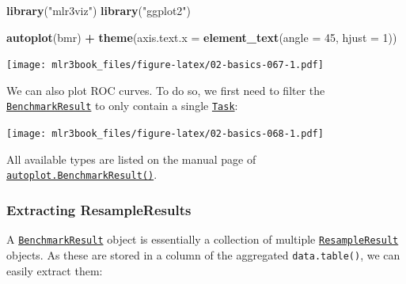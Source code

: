 \documentclass[]{article}
\newenvironment{Shaded}{\begin{snugshade}}{\end{snugshade}}
\newcommand{\DataTypeTok}[1]{\textcolor[rgb]{0.13,0.29,0.53}{#1}}
\newcommand{\DecValTok}[1]{\textcolor[rgb]{0.00,0.00,0.81}{#1}}
\newcommand{\KeywordTok}[1]{\textcolor[rgb]{0.13,0.29,0.53}{\textbf{#1}}}
\newcommand{\NormalTok}[1]{#1}
\newcommand{\OperatorTok}[1]{\textcolor[rgb]{0.81,0.36,0.00}{\textbf{#1}}}
\newcommand{\StringTok}[1]{\textcolor[rgb]{0.31,0.60,0.02}{#1}}
\renewenvironment{Shaded} {\begin{snugshade}\small} {\end{snugshade}}
\begin{document}
\begin{Shaded}
\begin{Highlighting}[]
\KeywordTok{library}\NormalTok{(}\StringTok{"mlr3viz"}\NormalTok{)}
\KeywordTok{library}\NormalTok{(}\StringTok{"ggplot2"}\NormalTok{)}

\KeywordTok{autoplot}\NormalTok{(bmr) }\OperatorTok{+}\StringTok{ }\KeywordTok{theme}\NormalTok{(}\DataTypeTok{axis.text.x =} \KeywordTok{element_text}\NormalTok{(}\DataTypeTok{angle =} \DecValTok{45}\NormalTok{, }\DataTypeTok{hjust =} \DecValTok{1}\NormalTok{))}
\end{Highlighting}
\end{Shaded}

\texttt{[image: mlr3book\_files/figure-latex/02-basics-067-1.pdf]}

We can also plot ROC curves.
To do so, we first need to filter the \href{https://mlr3.mlr-org.com/reference/BenchmarkResult.html}{\texttt{BenchmarkResult}} to only contain a single \href{https://mlr3.mlr-org.com/reference/Task.html}{\texttt{Task}}:

\begin{Shaded}
\end{Shaded}

\texttt{[image: mlr3book\_files/figure-latex/02-basics-068-1.pdf]}

All available types are listed on the manual page of \href{https://mlr3viz.mlr-org.com/reference/autoplot.BenchmarkResult.html}{\texttt{autoplot.BenchmarkResult()}}.

\hypertarget{bm-resamp}{%
\subsubsection{Extracting ResampleResults}\label{bm-resamp}}

A \href{https://mlr3.mlr-org.com/reference/BenchmarkResult.html}{\texttt{BenchmarkResult}} object is essentially a collection of multiple \href{https://mlr3.mlr-org.com/reference/ResampleResult.html}{\texttt{ResampleResult}} objects.
As these are stored in a column of the aggregated \texttt{data.table()}, we can easily extract them:
\end{document}
